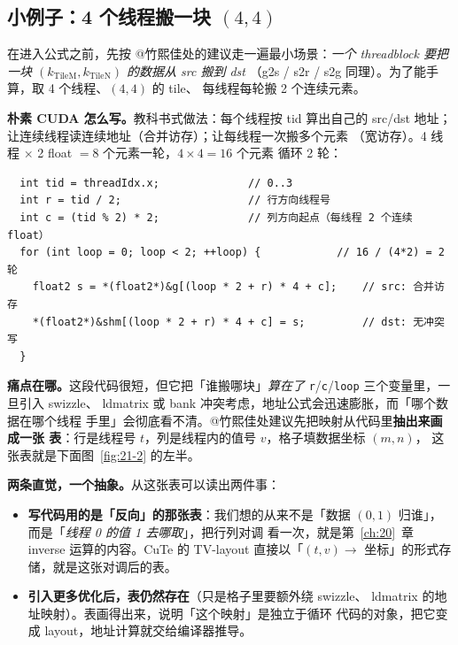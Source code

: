 \subsection{小例子：4 个线程搬一块 $(4,4)$}

在进入公式之前，先按 @竹熙佳处的建议走一遍最小场景：\emph{一个 threadblock
要把一块 $(k_{\mathrm{TileM}},k_{\mathrm{TileN}})$ 的数据从 src 搬到 dst}
（g2s / s2r / s2g 同理）。为了能手算，取 4 个线程、$(4,4)$ 的 tile、
每线程每轮搬 2 个连续元素。

\textbf{朴素 CUDA 怎么写。}教科书式做法：每个线程按 tid 算出自己的
src/dst 地址；让连续线程读连续地址（合并访存）；让每线程一次搬多个元素
（宽访存）。4 线程 $\times$ 2 float $= 8$ 个元素一轮，$4\times4=16$ 个元素
循环 2 轮：

\begin{lstlisting}
  int tid = threadIdx.x;              // 0..3
  int r = tid / 2;                    // 行方向线程号
  int c = (tid % 2) * 2;              // 列方向起点（每线程 2 个连续 float）
  for (int loop = 0; loop < 2; ++loop) {            // 16 / (4*2) = 2 轮
    float2 s = *(float2*)&g[(loop * 2 + r) * 4 + c];    // src: 合并访存
    *(float2*)&shm[(loop * 2 + r) * 4 + c] = s;         // dst: 无冲突写
  }
\end{lstlisting}

\textbf{痛点在哪。}这段代码很短，但它把「谁搬哪块」\emph{算在了}
\texttt{r}/\texttt{c}/\texttt{loop} 三个变量里，一旦引入 swizzle、
ldmatrix 或 bank 冲突考虑，地址公式会迅速膨胀，而「哪个数据在哪个线程
手里」会彻底看不清。@竹熙佳处建议先把映射从代码里\textbf{抽出来画成一张
表}：行是线程号 $t$，列是线程内的值号 $v$，格子填数据坐标 $(m,n)$，
这张表就是下面图~\ref{fig:21-2} 的左半。

\textbf{两条直觉，一个抽象。}从这张表可以读出两件事：

\begin{itemize}
  \item \textbf{写代码用的是「反向」的那张表}：我们想的从来不是「数据
        $(0,1)$ 归谁」，而是「\emph{线程 0 的值 1 去哪取}」，把行列对调
        看一次，就是第~\ref{ch:20}~章 inverse 运算的内容。CuTe 的
        TV-layout 直接以「$(t,v)\to$ 坐标」的形式存储，就是这张对调后的表。
  \item \textbf{引入更多优化后，表仍然存在}（只是格子里要额外绕 swizzle、
        ldmatrix 的地址映射）。表画得出来，说明「这个映射」是独立于循环
        代码的对象，把它变成 layout，地址计算就交给编译器推导。
\end{itemize}

